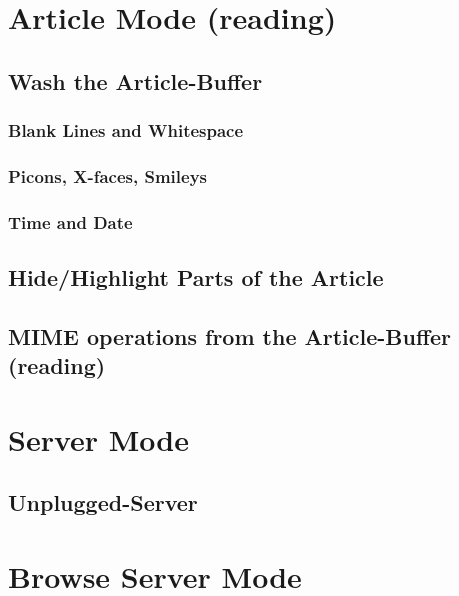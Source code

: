 \section*{Article Mode (reading)}
\ArticleModeGeneral
    \subsection*{Wash the Article-Buffer}
    \WashArticle
    \subsubsection*{Blank Lines and Whitespace}
    \BlankAndWhitespace
    \subsubsection*{Picons, X-faces, Smileys}
    \Picons
    \subsubsection*{Time and Date}
    \TimeAndDate
    \subsection*{Hide/Highlight Parts of the Article}
    \HideHighlightArticle
    \subsection*{MIME operations from the Article-Buffer (reading)}
    \MIMEArticleMode
%
%
\section*{Server Mode}
\ServerMode
    \subsection*{Unplugged-Server}
    \ServerUnplugged
%
%
\section*{Browse Server Mode}
\BrowseServer

\vspace*{\fill}
\Copyright





